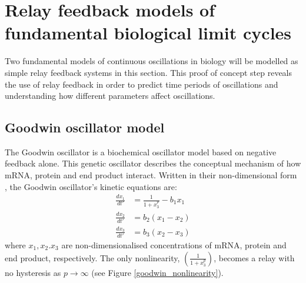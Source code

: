 \documentclass[a4paper, 12pt]{article}
\begin{document}
\FloatBarrier
\clearpage
\section{Relay feedback models of fundamental biological limit cycles}\label{Sec:continous oscillations}
Two fundamental models of continuous oscillations in biology will be modelled as simple relay feedback systems in this section. This proof of concept step reveals the use of relay feedback in order to predict time periods of oscillations and understanding how different parameters affect oscillations. 

\subsection{Goodwin oscillator model}
The Goodwin oscillator is a biochemical oscillator model based on negative feedback alone. This genetic oscillator describes the conceptual mechanism of how mRNA, protein and end product interact. Written in their non-dimensional form \cite{fall}, the Goodwin oscillator's kinetic equations are:
\begin{align}
\frac{dx_1}{dt'} &= \frac{1}{1 + x_3^p} - b_1x_1 \\
\frac{dx_2}{dt'} &= b_2(x_1 - x_2) \\
\frac{dx_3}{dt'} &= b_3(x_2 - x_3)
\end{align}
where $x_1,x_2.x_3$ are non-dimensionalised concentrations of mRNA, protein and end product, respectively. 
\noindent The only nonlinearity, $(\frac{1}{1 + x_3^p})$, becomes a relay with no hysteresis as $p \rightarrow \infty$ (see Figure \ref{goodwin_nonlinearity}).
\end{document}
